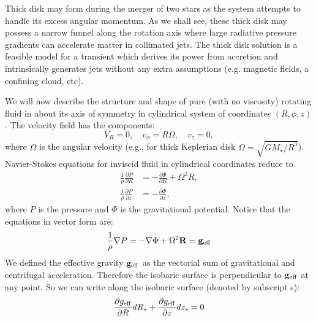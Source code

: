 \documentclass[modern]{aastex62}
\renewcommand{\vec}[1]{\mathbf{#1}}
\begin{document}
Thick disk may form during the merger of two stars as the system attempts to handle its excess angular momentum.
As we shall see, these thick disk may possess a narrow funnel along the rotation axis where large radiative pressure gradients can accelerate matter in collimated jets. 
The thick disk solution is a feasible model for a transient which derives its power from accretion and intrinsically generates jets without any extra assumptions (e.g. magnetic fields, a confining cloud, etc).

We will now describe the structure and shape of pure (with no viscosity) rotating fluid in about its axis of symmetry in cylindrical system of coordinates $(R,\phi,z)$. 
The velocity field has the components: 
\begin{equation}\label{eq:velocity_field_components}
V_R=0, \quad v_\phi=R\Omega, \quad v_z=0,
\end{equation}
where $\Omega$ is the angular velocity (e.g., for thick Keplerian disk $\Omega=\sqrt{G M_\star / R^3}$).
Navier-Stokes equations for inviscid fluid in cylindrical coordinates reduce to
\begin{equation}
\begin{split}
\label{eq:inviscid_fluid}
\frac{1}{\rho} \frac{\partial P}{\partial R} &= - \frac{\partial \Phi}{\partial R} + \Omega^2R,  \\
\frac{1}{\rho} \frac{\partial P}{\partial z} &= - \frac{\partial \Phi}{\partial z} ,
\end{split}
\end{equation}
where $P$ is the pressure and $\Phi$ is the gravitational potential.
Notice that the equations in vector form are:
\begin{equation}\label{eq:vector_inviscid_fluid}
\frac{1}{\rho}\mathbf{\nabla} P = -\mathbf{\nabla}\Phi+\Omega^2\mathbf{R} = \vec{g_{\rm{eff}}}
\end{equation}
We defined the effective gravity $\vec{g_{\rm{\rm{eff}}}}$ as the vectorial sum of gravitational and centrifugal acceleration. Therefore the isobaric surface is perpendicular to $\vec{g_{\rm{eff}}}$ at any point.
So we can write along the isobaric surface (denoted by subscript s):
\begin{equation}
\frac{\partial g_{\rm{eff}}}{\partial R} dR_s + \frac{\partial g_{\rm{eff}}}{\partial z} dz_s =0
\end{equation}
\end{document}
